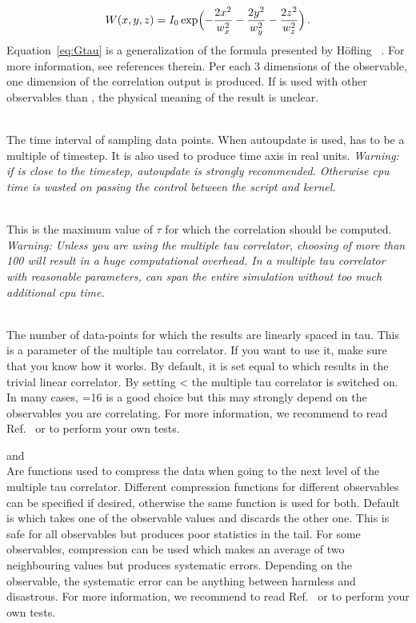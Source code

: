 \begin{arguments}
\begin{itemize}
\begin{equation}
    W(x,y,z) = I_0 \exp \Bigl( - \frac{2x^2}{w_x^2} - \frac{2y^2}{w_y^2} - \frac{2z^2}{w_z^2} \Bigr)\,.
    \end{equation}
    Equation~\ref{eq:Gtau} is a generalization of the formula presented by 
    H\"ofling \etal~\cite{hofling11a}. For more information, see references therein.
    Per each 3 dimensions of the observable, one dimension of the correlation output
    is produced. If  is used with other observables than 
    , the physical meaning of the result is unclear.
  \end{itemize}
\item {} \\
  The time interval of sampling data points. When autoupdate is used,  has
  to be a multiple of timestep. It is also used to produce time axis in real units.
  \textit{Warning: if  is close to the timestep, autoupdate is strongly recommended.
  Otherwise cpu time is wasted on passing the control between the script and kernel.}
\item {} \\
  This is the maximum value of $\tau$ for which the correlation should be computed.
  \textit{Warning: Unless you are using the multiple tau correlator, choosing 
  of more than 100 will result in a huge computational overhead.
  In a multiple tau correlator with reasonable parameters, 
   can span the entire simulation without
  too much additional cpu time.}
\item {} \\
  The number of data-points for which the results are linearly spaced
  in tau.  This is a parameter of the multiple tau correlator. If you
  want to use it, make sure that you know how it works. By default, it
  is set equal to  which results in the trivial linear
  correlator. By setting  <  the multiple
  tau correlator is switched on. In many cases, =16 is a
  good choice but this may strongly depend on the observables you are
  correlating.  For more information, we recommend to read
  Ref.~\cite{ramirez10a} or to perform your own tests.
\item {} and  \\
  Are functions used to compress the data when going to the next level
  of the multiple tau correlator. Different compression functions for
  different observables can be specified if desired, otherwise the
  same function is used for both.  Default is  which
  takes one of the observable values and discards the other one. This
  is safe for all observables but produces poor statistics in the
  tail. For some observables,  compression can be used
  which makes an average of two neighbouring values but produces
  systematic errors.  Depending on the observable, the systematic
  error can be anything between harmless and disastrous. For more
  information, we recommend to read Ref.~\cite{ramirez10a} or to
  perform your own tests.
\end{arguments}

